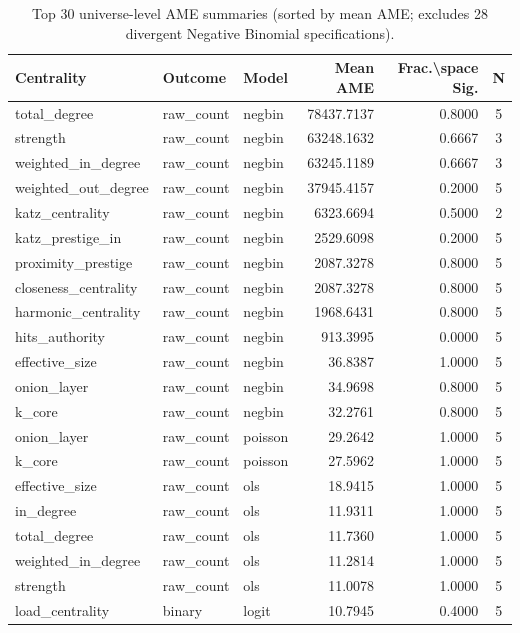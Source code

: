 \begin{table}[htbp]
\centering
\caption{Top 30 universe-level AME summaries (sorted by mean AME; excludes 28 divergent Negative Binomial specifications).}
\label{tab:ame_summary}
\begin{tabular}{lllrrc}
\toprule
Centrality & Outcome & Model & Mean AME & Frac.\textbackslash space Sig. & N \\
\midrule
total\_degree & raw\_count & negbin & 78437.7137 & 0.8000 & 5 \\
strength & raw\_count & negbin & 63248.1632 & 0.6667 & 3 \\
weighted\_in\_degree & raw\_count & negbin & 63245.1189 & 0.6667 & 3 \\
weighted\_out\_degree & raw\_count & negbin & 37945.4157 & 0.2000 & 5 \\
katz\_centrality & raw\_count & negbin & 6323.6694 & 0.5000 & 2 \\
katz\_prestige\_in & raw\_count & negbin & 2529.6098 & 0.2000 & 5 \\
proximity\_prestige & raw\_count & negbin & 2087.3278 & 0.8000 & 5 \\
closeness\_centrality & raw\_count & negbin & 2087.3278 & 0.8000 & 5 \\
harmonic\_centrality & raw\_count & negbin & 1968.6431 & 0.8000 & 5 \\
hits\_authority & raw\_count & negbin & 913.3995 & 0.0000 & 5 \\
effective\_size & raw\_count & negbin & 36.8387 & 1.0000 & 5 \\
onion\_layer & raw\_count & negbin & 34.9698 & 0.8000 & 5 \\
k\_core & raw\_count & negbin & 32.2761 & 0.8000 & 5 \\
onion\_layer & raw\_count & poisson & 29.2642 & 1.0000 & 5 \\
k\_core & raw\_count & poisson & 27.5962 & 1.0000 & 5 \\
effective\_size & raw\_count & ols & 18.9415 & 1.0000 & 5 \\
in\_degree & raw\_count & ols & 11.9311 & 1.0000 & 5 \\
total\_degree & raw\_count & ols & 11.7360 & 1.0000 & 5 \\
weighted\_in\_degree & raw\_count & ols & 11.2814 & 1.0000 & 5 \\
strength & raw\_count & ols & 11.0078 & 1.0000 & 5 \\
load\_centrality & binary & logit & 10.7945 & 0.4000 & 5 \\

\end{tabular}
\end{table}
